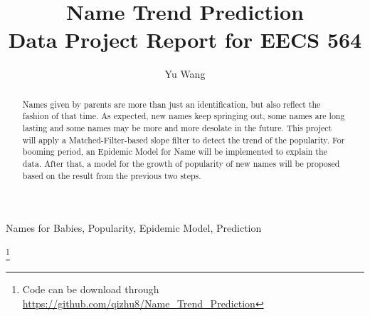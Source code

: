 \documentclass[journal]{IEEEtran}
\begin{document}
\title{Name Trend Prediction\\Data Project Report for EECS 564}

\author{Yu Wang%
}

\maketitle

\begin{abstract}
Names given by parents are more than just an identification, but also reflect the fashion of that time. 
As expected, new names keep springing out, some names are long lasting and some names may be more and more desolate in the future. This project will apply a Matched-Filter-based slope filter to detect the trend of the popularity. For booming period, an Epidemic Model for Name will be implemented to explain the data. After that, a model for the growth of popularity of new names will be proposed based on the result from the previous two steps. 
\end{abstract}

\begin{IEEEkeywords}
Names for Babies, Popularity, Epidemic Model, Prediction
\end{IEEEkeywords}

\IEEEpeerreviewmaketitle


\footnote{Code can be download through \url{https://github.com/qizhu8/Name_Trend_Prediction}}
\end{document}
